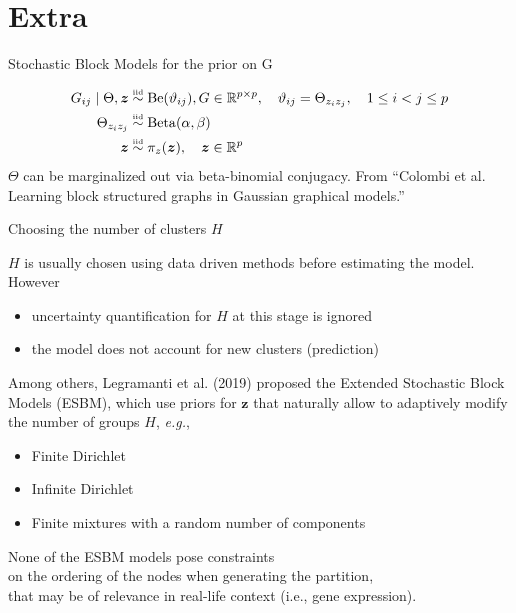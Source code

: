 \section*{Extra}
\begin{frame}{Stochastic Block Models for the prior on G}

\begin{align*}
    G_{ij} \mid \Theta,\bm{z} &\overset{\text{\tiny{iid}}}{\sim} \operatorname{Be}(\vartheta_{ij}),  G \in \mathbb{R}^{p \times p}, \quad \vartheta_{ij} = \Theta_{z_{i}z_{j}}, \quad 1 \le i < j \le p \\ 
    \Theta_{z_{i}z_{j}} &\overset{\text{\tiny{iid}}}{\sim} \operatorname{Beta}(\alpha, \beta)\\
    \bm{z} &\overset{\text{\tiny{iid}}}{\sim} \pi_{z}(\bm{z}), \quad \bm{z} \in \mathbb{R}^p
\end{align*}
$\Theta$ can be marginalized out via beta-binomial conjugacy.
{\scriptsize From ``Colombi et al. Learning block structured graphs in Gaussian graphical models.''}
\end{frame}














\begin{frame}{Choosing the number of clusters $H$}

$H$ is usually chosen using data driven methods \alert{before} estimating the model. However
\begin{itemize}
    \item uncertainty quantification for $H$ at this stage is ignored
    \item the model does not account for new clusters (\alert{prediction})
\end{itemize}
\pause
Among others, Legramanti et al. (2019) proposed the \alert{Extended Stochastic Block Models (ESBM)}, which use priors for $\bm{z}$ that naturally allow to adaptively modify the number of groups $H$, \emph{e.g.},
\begin{itemize}
    \item Finite Dirichlet
    \item Infinite Dirichlet
    \item Finite mixtures with a random number of components
\end{itemize}

\pause
\begin{center}
    \alert{None of the ESBM models pose constraints\\
    on the ordering of the nodes when generating the partition,\\
    that may be of relevance in real-life context (i.e., gene expression).}    
\end{center}


\end{frame}